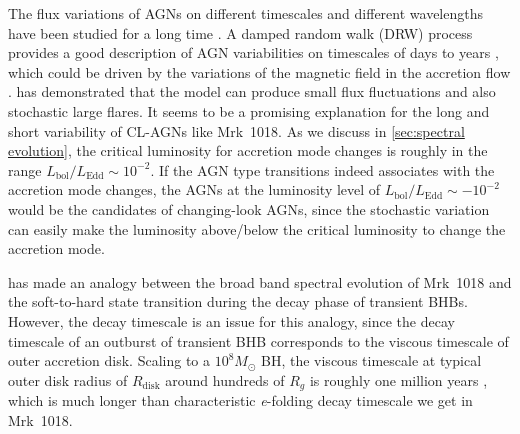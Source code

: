 \documentclass[twocolumn]{aastex63}
\begin{document}
The flux variations of AGNs on different timescales and different wavelengths have been studied for a long time \citep[see reviews in ][]{1997ARA&A..35..445U}. A damped random walk (DRW) process provides a good description of AGN variabilities on timescales of days to years \citep[e.g.][]{2010ApJ...721.1014M,2011ApJ...730...52K}, which could be driven by the variations of the magnetic field in the accretion flow \citep{2004MNRAS.348..111K,2006MNRAS.368..379M,2007A&A...466..793J}. \citet{2004MNRAS.348..111K} has demonstrated that the model can produce small flux fluctuations and also stochastic large flares. It seems to be a promising explanation for the long and short variability of CL-AGNs like Mrk~1018. As we discuss in \autoref{sec:spectral evolution}, the critical luminosity for accretion mode changes is roughly in the range $L_\mathrm{bol}/L_\mathrm{Edd}\sim 10^{-2}$. If the AGN type transitions indeed associates with the accretion mode changes, the AGNs at the luminosity level of $L_\mathrm{bol}/L_\mathrm{Edd}\sim -10^{-2}$ would be the candidates of changing-look AGNs, since the stochastic variation can easily make the luminosity above/below the critical luminosity to change the accretion mode. 

\citet{2018MNRAS.480.3898N} has made an analogy between the broad band spectral evolution of Mrk~1018 and the soft-to-hard state transition during the decay phase of transient BHBs. However, the decay timescale is an issue for this analogy, since the decay timescale of an outburst of transient BHB corresponds to the viscous timescale of outer accretion disk. Scaling to a $10^{8}M_{\odot}$ BH, the viscous timescale at typical outer disk radius of $R_\mathrm{disk}$ around hundreds of $R_g$ is roughly one million years \citep{2012MmSAI..83..469L,2018MNRAS.475.1190Y}, which is much longer than characteristic \textit{e}-folding decay timescale we get in Mrk~1018.  
\end{document}
